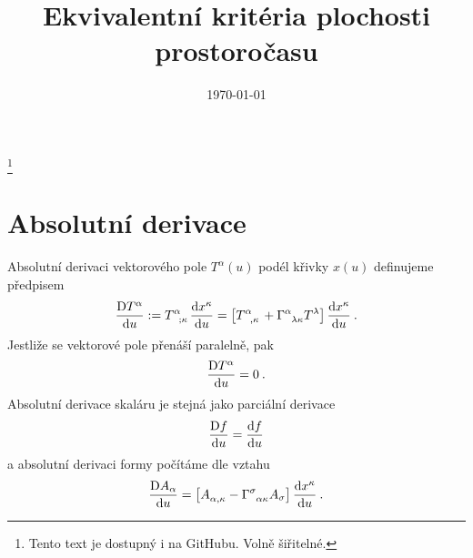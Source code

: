 \documentclass{article}
\title{Ekvivalentní kritéria plochosti prostoročasu}
\author{\spacedlowsmallcaps{Miroslav Burýšek, Filip Novotný, Tomáš Tesař}}
\date{\today}
\begin{document}
\renewcommand{\sectionmark}[1]{\markright{\spacedlowsmallcaps{#1}}} %
\lehead{\mbox{\llap{\small\thepage\kern1em\color{halfgray} \vline}\color{halfgray}\hspace{0.5em}\rightmark\hfil}} %

\pagestyle{scrheadings} %


\maketitle

\footnote{Tento text je dostupný i na GitHubu. Volně šiřitelné.}

\section*{Absolutní derivace}

Absolutní derivaci vektorového pole $T^\alpha(u)$ podél křivky $x(u)$ definujeme předpisem
\begin{align}
    \ader{T^\alpha}{u} := T\indices{^\alpha_;_\kappa} \der{x^\kappa}{u} = \left[ T\indices{^\alpha_,_\kappa} + \Gamma\indices{^\alpha_\lambda_\kappa} T^\lambda \right] \der{x^\kappa}{u} \:.
\end{align}
Jestliže se vektorové pole přenáší paralelně, pak \begin{align}
    \frac{\mathrm{D} T^\alpha}{\mathrm{d} u} = 0 \:.
\end{align}
Absolutní derivace skaláru je stejná jako parciální derivace
\begin{align}
    \frac{\mathrm{D} f}{\mathrm{d} u} = \frac{\mathrm{d}f}{\mathrm{d}u}
\end{align}
a absolutní derivaci formy počítáme dle vztahu
\begin{align}
    \ader{A_\alpha}{u} = \left[ A\indices{_\alpha_,_\kappa} - \Gamma\indices{^\sigma_\alpha_\kappa} A_{\sigma} \right] \der{x^\kappa}{u} \:.
\end{align}
\end{document}
